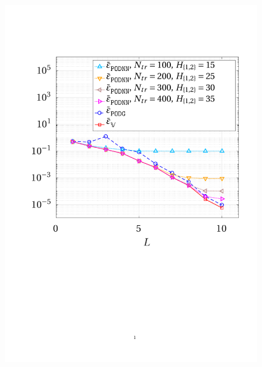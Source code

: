\documentclass[12pt, a4paper, twoside, openright]{report}
\numberwithin{equation}{chapter}
\theoremstyle{theorem}
\theoremstyle{definition}
\theoremstyle{remark}
\theoremstyle{proposition}
\numberwithin{figure}{chapter}
\begin{document}
		\begin{figure}[H]
			\center
			\includegraphics[scale = 0.42, trim = {1cm 9cm 1cm 2cm}, clip]{poisson1d_3_error_vs_rank}

\end{figure}
\end{document}
